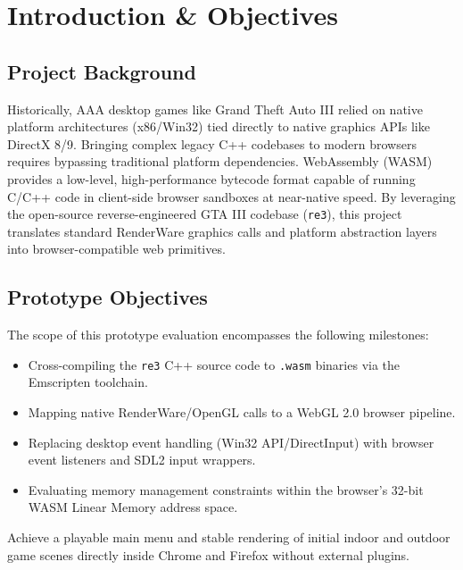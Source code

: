 \documentclass[12pt,a4paper]{article}
\begin{document}
\tableofcontents
\thispagestyle{plain}
\newpage

\section{Introduction \& Objectives}

\subsection{Project Background}
Historically, AAA desktop games like Grand Theft Auto III relied on native platform architectures (x86/Win32) tied directly to native graphics APIs like DirectX 8/9. Bringing complex legacy C++ codebases to modern browsers requires bypassing traditional platform dependencies. WebAssembly (WASM) provides a low-level, high-performance bytecode format capable of running C/C++ code in client-side browser sandboxes at near-native speed. By leveraging the open-source reverse-engineered GTA III codebase (\texttt{re3}), this project translates standard RenderWare graphics calls and platform abstraction layers into browser-compatible web primitives.

\subsection{Prototype Objectives}
The scope of this prototype evaluation encompasses the following milestones:
\begin{itemize}
    \item Cross-compiling the \texttt{re3} C++ source code to \texttt{.wasm} binaries via the Emscripten toolchain.
    \item Mapping native RenderWare/OpenGL calls to a WebGL 2.0 browser pipeline.
    \item Replacing desktop event handling (Win32 API/DirectInput) with browser event listeners and SDL2 input wrappers.
    \item Evaluating memory management constraints within the browser's 32-bit WASM Linear Memory address space.
\end{itemize}

\begin{summarybox}[title=Prototype Target State]
Achieve a playable main menu and stable rendering of initial indoor and outdoor game scenes directly inside Chrome and Firefox without external plugins.
\end{summarybox}
\end{document}
